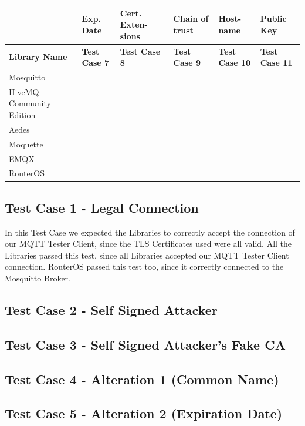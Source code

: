\documentclass[binding=0.6cm,noexaminfo]{sapthesis}
\newcommand{\cmark}{\ding{51}}%
\begin{document}
\begin{flushleft}
\begin{tabular}{| p{2cm} | p{1.5cm} | p{1.5cm} | p{1.5cm} | p{1.5cm} | p{1.5cm} |}
\hline
 & \bf Exp. Date & \bf Cert. Exten- sions & \bf Chain of trust & \bf Host- name & \bf Public Key \\
\hline
\bf Library Name & \bf Test Case 7 & \bf Test Case 8 & \bf Test Case 9 & \bf Test Case 10 & \bf Test Case 11 \\
\hline
Mosquitto & \cmark & \cmark & \cmark & \cmark & \cmark \\
\hline
HiveMQ Community Edition & \cmark & \cmark & \cmark & \cmark & \cmark \\
\hline
Aedes & \cmark & \cmark & \cmark & \cmark & \cmark \\
\hline
Moquette & \cmark & \cmark & \cmark & \cmark & \cmark \\
\hline
EMQX & \cmark & \cmark & \cmark & \cmark & \cmark \\
\hline
RouterOS & \cmark & \cmark & \cmark & \cmark & \cmark \\
\hline
\end{tabular}
\end{flushleft}

\subsection{Test Case 1 - Legal Connection}

In this Test Case we expected the Libraries to correctly accept the connection of our MQTT Tester Client, since the TLS Certificates used were all valid. All the Libraries passed this test, since all Libraries accepted our MQTT Tester Client connection.
RouterOS passed this test too, since it correctly connected to the Mosquitto Broker.

\subsection{Test Case 2 - Self Signed Attacker}
\subsection{Test Case 3 - Self Signed Attacker's Fake CA}
\subsection{Test Case 4 - Alteration 1 (Common Name)}
\subsection{Test Case 5 - Alteration 2 (Expiration Date)}
\end{document}
